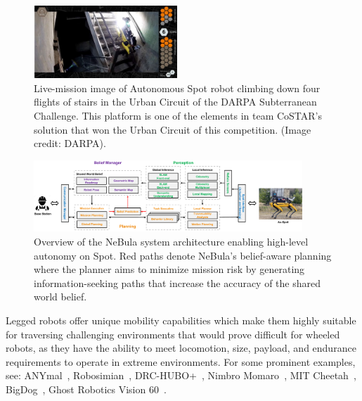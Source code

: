 \documentclass[letterpaper, 10pt, conference]{ieeeconf}      %
\newcommand{\ph}[1]{{\textbf{#1}:}} %
\newcommand{\rev}[1]{{\color{blue}#1}} %
\begin{document}
\begin{figure}[t!]
  \centering
  \includegraphics[width=0.48\textwidth,trim={0.5cm 0 0.5cm 0},clip]{graphics/spot_cover_ver1.jpg}
  \caption{%
  Live-mission image of Autonomous Spot robot climbing down four flights of stairs in the Urban Circuit of the DARPA Subterranean Challenge. This platform is one of the elements in team CoSTAR's solution that won the Urban Circuit of this competition. (Image credit: DARPA).} %
  
  
  \label{fig:stairs-firstPage}
\end{figure}

\begin{figure}[h!]
  \centering
  \includegraphics[width=0.9\textwidth]{graphics/spot_sa_v5.pdf}
  \caption{Overview of the NeBula system architecture enabling high-level autonomy on Spot. Red paths denote NeBula's belief-aware planning where the planner aims to minimize mission risk by generating information-seeking paths that increase the accuracy of the shared world belief. %
}
  \label{fig:spot_sysarch}
\end{figure}

Legged robots offer unique mobility capabilities which make them highly suitable for traversing challenging environments that would prove difficult for wheeled robots, as they have the ability to meet locomotion, size, payload, and endurance requirements to operate in extreme environments. %
For some prominent examples, see: ANYmal~\cite{whyrobotdeepmines,Bellicoso2018}, Robosimian~\cite{Karumanchi2017}, DRC-HUBO+~\cite{jung2018development}, Nimbro Momaro~\cite{schwarz2017nimbro}, MIT Cheetah~\cite{mit_cheetah}, BigDog~\cite{bigdog}, Ghost Robotics Vision 60~\cite{miller2019tunnel}. 
\end{document}

